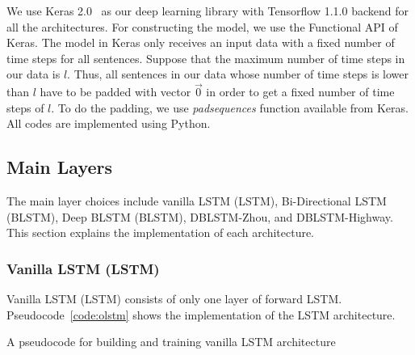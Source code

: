 We use Keras 2.0~\citep{chollet2015} as our deep learning library with Tensorflow 1.1.0 backend for all the architectures. For constructing the model, we use the Functional API of Keras. The model in Keras only receives an input data with a fixed number of time steps for all sentences. Suppose that the maximum number of time steps in our data is $l$. Thus, all sentences in our data whose number of time steps is lower than $l$ have to be padded with vector $ \vec{0}$ in order to get a fixed number of time steps of $l$. To do the padding, we use \textit{padsequences} function available from Keras. All codes are implemented using Python.

\subsection{Main Layers}
The main layer choices include vanilla LSTM (LSTM), Bi-Directional LSTM (BLSTM), Deep BLSTM (BLSTM), DBLSTM-Zhou, and DBLSTM-Highway. This section explains the implementation of each architecture.

\subsubsection{Vanilla LSTM (LSTM)}
Vanilla LSTM (LSTM) consists of only one layer of forward LSTM. Pseudocode~\ref{code:olstm} shows the implementation of the LSTM architecture.

\begin{kode}

	
	\caption{A pseudocode for building and training vanilla LSTM architecture}
	\label{code:olstm}
\end{kode}

